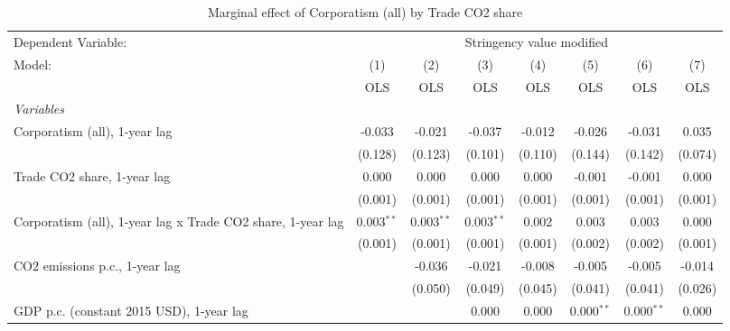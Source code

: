 
\begin{table}[htbp]
   \caption{Marginal effect of Corporatism (all) by Trade CO2 share}
   \centering
   \begin{tabular}{lccccccc}
      \toprule
      Dependent Variable: & \multicolumn{7}{c}{Stringency value modified}\\
      Model:                                                      & (1)          & (2)          & (3)          & (4)     & (5)           & (6)           & (7)\\  
                                                                  &  OLS         & OLS          & OLS          & OLS     & OLS           & OLS           & OLS\\  
      \midrule
      \emph{Variables}\\
      Corporatism (all), 1-year lag                               & -0.033       & -0.021       & -0.037       & -0.012  & -0.026        & -0.031        & 0.035\\   
                                                                  & (0.128)      & (0.123)      & (0.101)      & (0.110) & (0.144)       & (0.142)       & (0.074)\\   
      Trade CO2 share, 1-year lag                                 & 0.000        & 0.000        & 0.000        & 0.000   & -0.001        & -0.001        & 0.000\\   
                                                                  & (0.001)      & (0.001)      & (0.001)      & (0.001) & (0.001)       & (0.001)       & (0.001)\\   
      Corporatism (all), 1-year lag x Trade CO2 share, 1-year lag & 0.003$^{**}$ & 0.003$^{**}$ & 0.003$^{**}$ & 0.002   & 0.003         & 0.003         & 0.000\\   
                                                                  & (0.001)      & (0.001)      & (0.001)      & (0.001) & (0.002)       & (0.002)       & (0.001)\\   
      CO2 emissions p.c., 1-year lag                              &              & -0.036       & -0.021       & -0.008  & -0.005        & -0.005        & -0.014\\   
                                                                  &              & (0.050)      & (0.049)      & (0.045) & (0.041)       & (0.041)       & (0.026)\\   
      GDP p.c. (constant 2015 USD), 1-year lag                    &              &              & 0.000        & 0.000   & 0.000$^{**}$  & 0.000$^{**}$  & 0.000\\   

\end{tabular}
\end{table}
